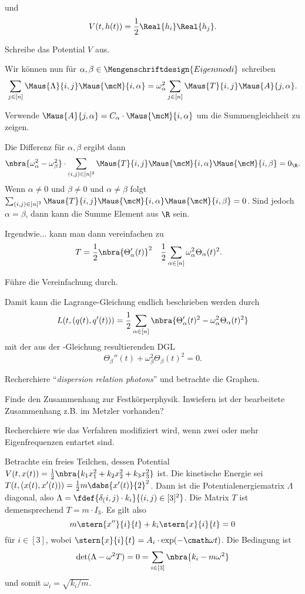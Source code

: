 \documentclass[../WiSe22ANA3.tex]{subfiles}
\begin{document}
		und 
		$$V(t,h(t))=\frac{1}{2}\Real{h_i}\Real{h_j}.$$
		\begin{Aufgabe}
			\nr Schreibe das Potential $V$ aus. 
		\end{Aufgabe}
		Wir können nun für $\alpha,\beta\in\Mengenschriftdesign{Eigenmodi}$ schreiben
		$$\sum_{j\in[n]}\Maus{\Lambda}{i,j}\Maus{\mcM}{i,\alpha}=\omega_\alpha^2\sum_{j\in[n]}\Maus{T}{i,j}\Maus{A}{j,\alpha}.$$
		\begin{Aufgabe}
			\nr Verwende $\Maus{A}{j,\alpha}=C_\alpha\cdot\Maus{\mcM}{i,\alpha}$ um die Summengleichheit zu zeigen. 
		\end{Aufgabe}
		Die Differenz für $\alpha,\beta$ ergibt dann
		$$\nbra{\omega_\alpha^2-\omega_\beta^2}\cdot\sum_{(i,j)\in[n]^2}\Maus{T}{i,j}\Maus{\mcM}{i,\alpha}\Maus{\mcM}{i,\beta}=0_\R.$$
		Wenn $\alpha\neq 0$ und $\beta\neq 0$ und $\alpha\neq\beta$ folgt $\sum_{(i,j)\in[n]^2}\Maus{T}{i,j}\Maus{\mcM}{i,\alpha}\Maus{\mcM}{i,\beta}=0$. Sind jedoch $\alpha=\beta$, dann kann die Summe Element aus $\R$ sein. 
		
		Irgendwie... kann man dann vereinfachen zu 
		\begin{align*}
			&T=\frac{1}{2}\nbra{\Theta_\alpha'(t)}^2 &&\frac{1}{2}\sum_{\alpha\in[n]}\omega_\alpha^2\Theta_\alpha(t)^2.
		\end{align*}
		\begin{Aufgabe}
			\nr Führe die Vereinfachung durch. 
		\end{Aufgabe}
		Damit kann die Lagrange-Gleichung endlich beschrieben werden durch
		$$L(t,(q(t),q'(t)))=\frac{1}{2}\sum_{\alpha\in[n]}\nbra{\Theta_\alpha'(t)^2-\omega_\alpha^2\Theta_\alpha(t)^2}$$
		mit der aus der \Euler-\Lagrange Gleichung resultierenden DGL
		$$\Theta_\beta''(t)+\omega_\beta^2\Theta_\beta(t)^2=0.$$
		\begin{Aufgabe}
			\nr Recherchiere \enquote{\emph{dispersion relation photons}} und betrachte die Graphen. 
			
			\nr Finde den Zusammenhang zur Festkörperphysik. Inwiefern ist der bearbeitete Zusammenhang z.B. im Metzler vorhanden? 
			
			\nr Recherchiere wie das Verfahren modifiziert wird, wenn zwei oder mehr Eigenfrequenzen entartet sind. 
		\end{Aufgabe}
		\begin{Beispiel}
			Betrachte ein freies Teilchen, dessen Potential $V(t,x(t))=\frac{1}{2}\nbra{k_1x_1^2+k_2x_2^2+k_3x_3^2}$ ist. Die kinetische Energie sei $T(t,(x(t),x'(t)))=\frac{1}{2}m\dabs{x'(t)}{2}^2$. Dann ist die Potentialenergiematrix $\Lambda$ diagonal, also $\Lambda=\fdef{\delta_(i,j)\cdot k_i}{(i,j)\in[3]^2}$. Die Matrix $T$ ist demensprechend $T=m\cdot I_3$. Es gilt also 
			$$m\stern{x''}{i}{t}+k_i\stern{x}{i}{t}=0$$
			für $i\in[3]$, wobei $\stern{x}{i}{t}=A_i\cdot\exp(-\cmath\omega t)$. Die Bedingung ist 
			$$\det(\Lambda-\omega^2 T)=0=\sum_{i\in[3]}\nbra{k_i-m\omega^2}$$
			und somit $\omega_i=\sqrt{k_i/m}$. 
		\end{Beispiel}
\end{document}
